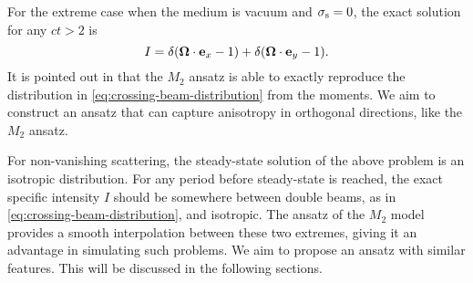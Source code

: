 For the extreme case when the medium
is vacuum and $\sigma_{\mathrm{s}} = 0$, the exact solution for any $ct > 2$
is
\begin{equation}\label{eq:crossing-beam-distribution}
  I = \delta(\bsOmega\cdot\be_x - 1) + 
  \delta(\bsOmega\cdot\be_y - 1).
\end{equation}
It is pointed out in \cite{pichard2016approximation} that 
the $M_2$ ansatz is able to exactly reproduce the distribution in
\eqref{eq:crossing-beam-distribution} from the moments. We aim to construct an
ansatz that can capture anisotropy in  
orthogonal directions, like the $M_2$ ansatz.

For non-vanishing scattering, the steady-state solution of the above 
problem is an isotropic distribution. For any period before steady-state
is reached, the exact specific intensity $I$ should be somewhere
between double beams, as in \eqref{eq:crossing-beam-distribution},
and isotropic. The ansatz of the $M_2$ model provides
a smooth interpolation between these two extremes, giving it an advantage 
in simulating such problems. We aim to propose an
ansatz with similar features. This will be discussed in the following sections.

